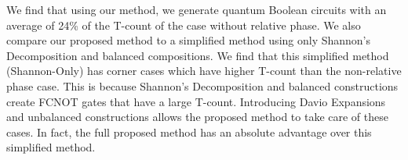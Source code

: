 \documentclass[a4paper]{article}
\begin{document}
{We find that using our method, we generate quantum Boolean circuits with an average of 24\% of
the T-count of the case without relative phase. We also compare our proposed method to a simplified
method using only Shannon's Decomposition and balanced compositions. We find that this simplified
method (Shannon-Only) has corner cases which have higher T-count than the non-relative phase case. This is because
Shannon's Decomposition and balanced constructions create FCNOT gates that have a large T-count.
Introducing Davio Expansions and unbalanced constructions allows the proposed method to take
care of these cases. In fact, the full proposed method has an absolute advantage over this simplified
method.



}
\end{document}
